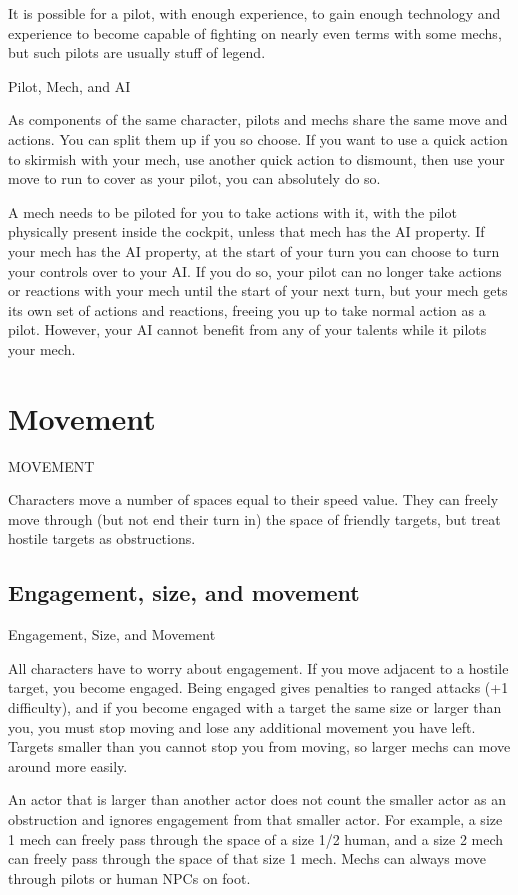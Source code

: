 It is possible for a pilot, with enough experience, to gain enough technology and experience to
become capable of fighting on nearly even terms with some mechs, but such pilots are usually
stuff of legend.

                                                Pilot, Mech, and AI

As components of the same character, pilots and mechs share the same move and actions. You
can split them up if you so choose. If you want to use a quick action to skirmish with your mech,
use another quick action to dismount, then use your move to run to cover as your pilot, you can
absolutely do so.

A mech needs to be piloted for you to take actions with it, with the pilot physically present inside
the cockpit, unless that mech has the AI property. If your mech has the AI property, at the start of
your turn you can choose to turn your controls over to your AI. If you do so, your pilot can no
longer take actions or reactions with your mech until the start of your next turn, but your mech
gets its own set of actions and reactions, freeing you up to take normal action as a pilot. However,
your AI cannot benefit from any of your talents while it pilots your mech.

\chapter{Movement}
MOVEMENT

Characters move a number of spaces equal to their speed value. They can freely move through
(but not end their turn in) the space of friendly targets, but treat hostile targets as obstructions.

\section{Engagement, size, and movement}
                             Engagement, Size, and Movement

All characters have to worry about engagement. If you move adjacent to a hostile target, you
become engaged. Being engaged gives penalties to ranged attacks (+1 difficulty), and if you
become engaged with a target the same size or larger than you, you must stop moving and lose
any additional movement you have left. Targets smaller than you cannot stop you from moving,
so larger mechs can move around more easily.


An actor that is larger than another actor does not count the smaller actor as an obstruction and
ignores engagement from that smaller actor. For example, a size 1 mech can freely pass through
the space of a size 1/2 human, and a size 2 mech can freely pass through the space of that size 1
mech. Mechs can always move through pilots or human NPCs on foot.


